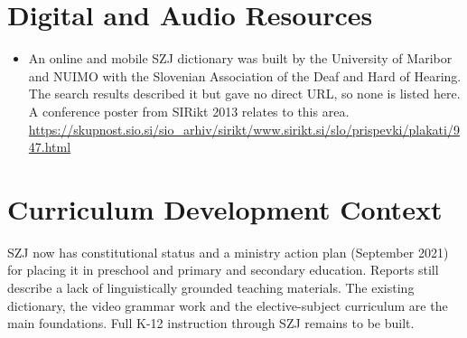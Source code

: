 \documentclass[12pt]{article}
\begin{document}
\section{Digital and Audio Resources}
\begin{itemize}
\item An online and mobile SZJ dictionary was built by the University of Maribor and NUIMO with the Slovenian Association of the Deaf and Hard of Hearing. The search results described it but gave no direct URL, so none is listed here. A conference poster from SIRikt 2013 relates to this area. \url{https://skupnost.sio.si/sio_arhiv/sirikt/www.sirikt.si/slo/prispevki/plakati/947.html}
\end{itemize}

\section{Curriculum Development Context}
SZJ now has constitutional status and a ministry action plan (September 2021) for placing it in preschool and primary and secondary education. Reports still describe a lack of linguistically grounded teaching materials. The existing dictionary, the video grammar work and the elective-subject curriculum are the main foundations. Full K-12 instruction through SZJ remains to be built.
\end{document}
